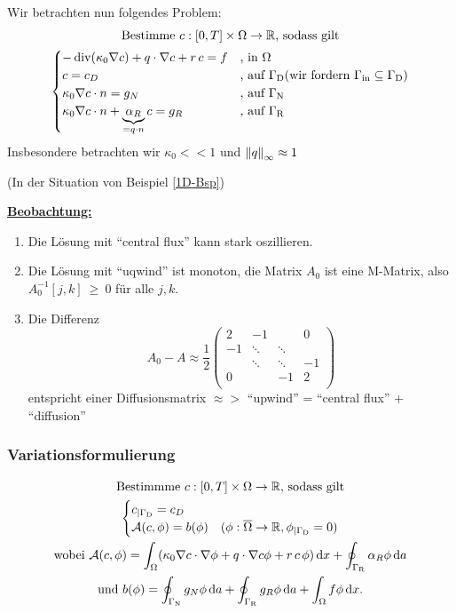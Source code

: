 Wir betrachten nun folgendes Problem:
\begin{gather*}
	\text{Bestimme } c:[0,T] \times \Omega \to \mathbb{R} \text{, sodass gilt}\\
	\begin{cases}
		- \operatorname{div}(\kappa_0 \nabla c) + q \cdot \nabla c + r \, c = f &\text{, in } \Omega\\
		c = c_D &\text{, auf } \Gamma_{\text{D}} (\text{wir fordern } \Gamma_{{\text{in}}} \subseteq \Gamma_{\text{D}})\\
		\kappa_0 \nabla c \cdot n = g_N &\text{, auf } \Gamma_{\text{N}}\\
		\kappa_0 \nabla c \cdot n  + \underbrace{\alpha_R}_{= q \cdot n} c = g_R &\text{, auf } \Gamma_{\text{R}}
	\end{cases}
\end{gather*}
Insbesondere betrachten wir $ \kappa_0 << 1 $ und $ \norm{q}_\infty \approx 1 $

\begin{examples}(In der Situation von Beispiel \ref{1D-Bsp})
\end{examples}

\underline{\textbf{Beobachtung:}}
\begin{enumerate}
	\item Die Lösung mit \enquote{central flux} kann stark oszillieren.
	\item Die Lösung mit \enquote{uqwind} ist monoton, die Matrix $ A_0 $ ist eine M-Matrix, also $ A_0^{-1}[j,k]~\geq~0 $ für alle $ j,k $.
	\item Die Differenz
	\[ A_0 - A \approx \frac{1}{2}
	\begin{pmatrix} 
	2 & -1 & & 0\\
	-1& \ddots &\ddots & \\
	  & \ddots& \ddots & -1\\	
	0 & & -1 & 2\\		
	\end{pmatrix} \] 
	entspricht einer Diffusionsmatrix $ \approx> $ \enquote{upwind} = \enquote{central flux} + \enquote{diffusion}
\end{enumerate}

\subsubsection{Variationsformulierung}
\begin{gather*}
	\text{Bestimmme } c:[0,T] \times \Omega \to \mathbb{R} \text{, sodass gilt}\\
	\begin{cases}
		c_{|\Gamma_{\text{D}}} = c_D &\\
		\mathcal{A}(c,\phi) = b(\phi) &(\phi: \overline{\Omega} \to \mathbb{R}, \phi_{|\Gamma_{\text{D}}} = 0)
	\end{cases}\\
	\text{wobei } \mathcal{A}(c,\phi) = \int_\Omega (\kappa_0 \nabla c \cdot \nabla \phi + q \cdot \nabla c \phi + r \, c \, \phi) \mathop{}\!\mathrm{d} x + \oint_{\Gamma_{\text{R}}} \alpha_R \phi \mathop{}\!\mathrm{d} a\\
	\text{und } b(\phi) = \oint_{\Gamma_{\text{N}}} g_N \phi \mathop{}\!\mathrm{d} a + \oint_{\Gamma_{\text{R}}} g_R \phi \mathop{}\!\mathrm{d} a + \int_\Omega f \phi \mathop{}\!\mathrm{d} x.
\end{gather*}

